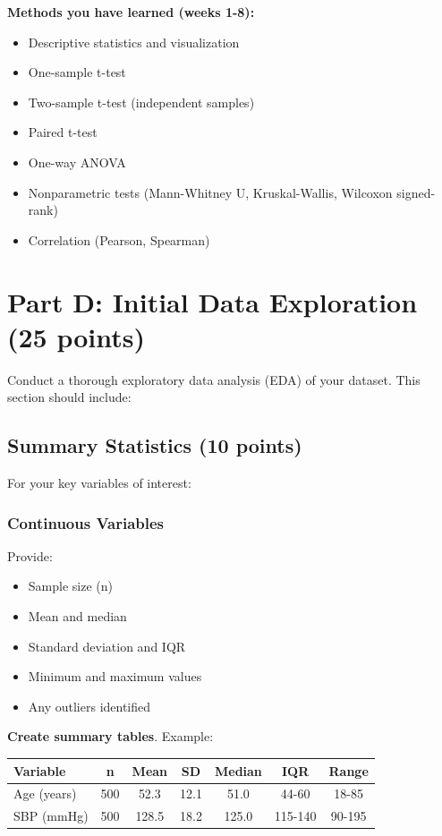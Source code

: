 \documentclass[11pt]{article}
\begin{document}
\textbf{Methods you have learned (weeks 1-8):}
\begin{itemize}
\item Descriptive statistics and visualization
\item One-sample t-test
\item Two-sample t-test (independent samples)
\item Paired t-test
\item One-way ANOVA
\item Nonparametric tests (Mann-Whitney U, Kruskal-Wallis, Wilcoxon signed-rank)
\item Correlation (Pearson, Spearman)
\end{itemize}

\newpage

\section{Part D: Initial Data Exploration (25 points)}

Conduct a thorough exploratory data analysis (EDA) of your dataset. This section should include:

\subsection{Summary Statistics (10 points)}

For your key variables of interest:

\subsubsection{Continuous Variables}
Provide:
\begin{itemize}
\item Sample size (n)
\item Mean and median
\item Standard deviation and IQR
\item Minimum and maximum values
\item Any outliers identified
\end{itemize}

\textbf{Create summary tables}. Example:

\begin{center}
\begin{tabular}{lcccccc}
\toprule
\textbf{Variable} & \textbf{n} & \textbf{Mean} & \textbf{SD} & \textbf{Median} & \textbf{IQR} & \textbf{Range} \\
\midrule
Age (years) & 500 & 52.3 & 12.1 & 51.0 & 44-60 & 18-85 \\
SBP (mmHg) & 500 & 128.5 & 18.2 & 125.0 & 115-140 & 90-195 \\
\bottomrule
\end{tabular}
\end{center}
\end{document}
